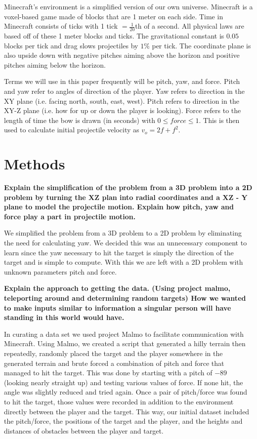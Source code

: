 \documentclass[twoside,twocolumn]{article}
\begin{document}
Minecraft's environment is a simplified version of our own universe. Minecraft is a voxel-based game made of blocks that are 1 meter on each side. Time in Minecraft consists of ticks with 1 tick $= \frac{1}{20}$th of a second. All physical laws are based off of these 1 meter blocks and ticks. The gravitational constant is $0.05$ blocks per tick and drag slows projectiles by $1\%$ per tick. The coordinate plane is also upside down with negative pitches aiming above the horizon and positive pitches aiming below the horizon.

Terms we will use in this paper frequently will be pitch, yaw, and force. Pitch and yaw refer to angles of direction of the player. Yaw refers to direction in the XY plane (i.e. facing north, south, east, west). Pitch refers to direction in the XY-Z plane (i.e. how for up or down the player is looking). Force refers to the length of time the bow is drawn (in seconds) with $0 \leq force \leq 1$. This is then used to calculate initial projectile velocity as $v_o = 2f + f^2$.



\section{Methods}

\textbf{Explain the simplification of the problem from a 3D problem into a 2D problem by turning the XZ plan into radial coordinates and a XZ - Y plane to model the projectile motion.
Explain how pitch, yaw and force play a part in projectile motion.}

We simplified the problem from a 3D problem to a 2D problem by eliminating the need for calculating yaw. We decided this was an unnecessary component to learn since the yaw necessary to hit the target is simply the direction of the target and is simple to compute. With this we are left with a 2D problem with unknown parameters pitch and force.

\textbf{Explain the approach to getting the data. (Using project malmo, teleporting around and determining random targets)
How we wanted to make inputs similar to information a singular person will have standing in this world would have.}

In curating a data set we used project Malmo to facilitate communication with Minecraft. Using Malmo, we created a script that generated a hilly terrain then repeatedly, randomly placed the target and the player somewhere in the generated terrain and brute forced a combination of pitch and force that managed to hit the target. This was done by starting with a pitch of $-89$ (looking nearly straight up) and testing various values of force. If none hit, the angle was slightly reduced and tried again. Once a pair of pitch/force was found to hit the target, those values were recorded in addition to the environment directly between the player and the target. This way, our initial dataset included the pitch/force, the positions of the target and the player, and the heights and distances of obstacles between the player and target.
\end{document}

